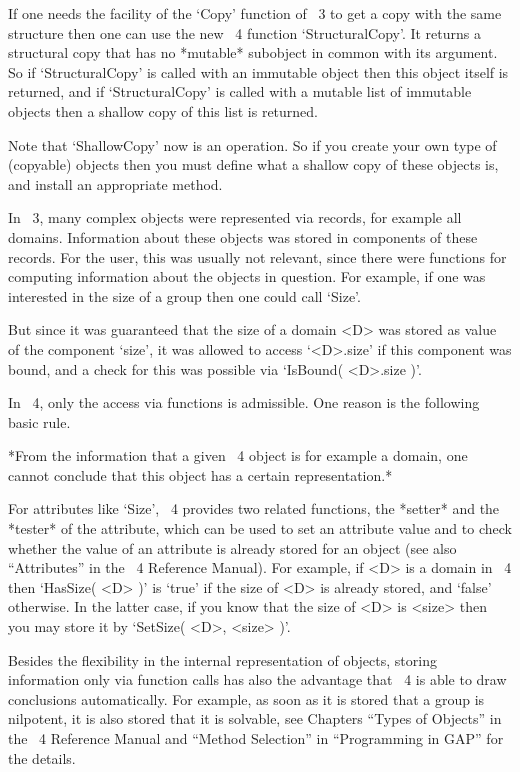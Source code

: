 If one needs the facility of the `Copy' function of {\GAP}~3 to get a
copy with the same structure then one can use the new {\GAP}~4
function `StructuralCopy'.  It returns a structural copy that has no
*mutable* subobject in common with its argument.  So if
`StructuralCopy' is called with an immutable object then this object
itself is returned, and if `StructuralCopy' is called with a mutable
list of immutable objects then a shallow copy of this list is
returned.

Note that `ShallowCopy' now is an operation.  So if you create your
own type of (copyable) objects then you must define what a shallow
copy of these objects is, and install an appropriate method.



In {\GAP}~3, many complex objects were represented via records, for
example all domains.  Information about these objects was stored in
components of these records.  For the user, this was usually not
relevant, since there were functions for computing information about
the objects in question.  For example, if one was interested in the
size of a group then one could call `Size'.

But since it was guaranteed that the size of a domain <D> was stored
as value of the component `size', it was allowed to access `<D>.size'
if this component was bound, and a check for this was possible via
`IsBound( <D>.size )'.

In {\GAP}~4, only the access via functions is admissible.  One reason
is the following basic rule.

*From the information that a given {\GAP}~4 object is for example a
domain, one cannot conclude that this object has a certain
representation.*

For attributes like `Size', {\GAP}~4 provides two related functions,
the *setter* and the *tester* of the attribute, which can be used to
set an attribute value and to check whether the value of an attribute
is already stored for an object (see also ``Attributes'' in the {\GAP}~4
Reference Manual).  For example, if <D> is a domain in {\GAP}~4 then
`HasSize( <D> )' is `true' if the size of <D> is already stored, and
`false' otherwise.  In the latter case, if you know that the size of
<D> is <size> then you may store it by `SetSize( <D>, <size> )'.

Besides the flexibility in the internal representation of objects,
storing information only via function calls has also the advantage
that {\GAP}~4 is able to draw conclusions automatically.  For example,
as soon as it is stored that a group is nilpotent, it is also stored
that it is solvable, see Chapters ``Types of Objects'' in the
{\GAP}~4 Reference Manual and ``Method Selection'' in ``Programming in GAP''
for the details.

